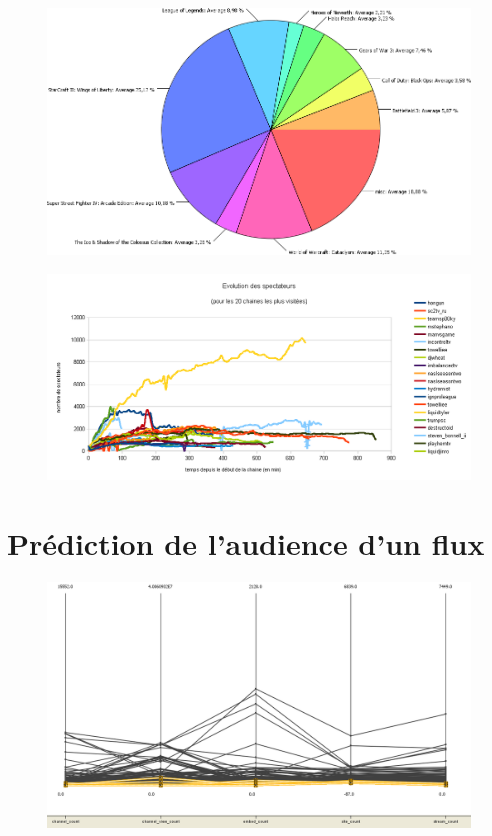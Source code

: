 \documentclass[11pt, a4paper, titlepage]{scrartcl}
\begin{document}
\begin{figure}[h]
    \centering
    \includegraphics[width=\textwidth]{images/main_games}
    \caption{}
\end{figure}

\begin{figure}[h]
    \centering
    \includegraphics[width=\textwidth]{images/top_20_view_evolutions}
    \caption{}
\end{figure}

\section{Prédiction de l'audience d'un flux}

\begin{figure}[h]
    \centering
    \includegraphics[width=\textwidth]{images/embed_enabled_influence}
    \caption{}
\end{figure}
\end{document}
